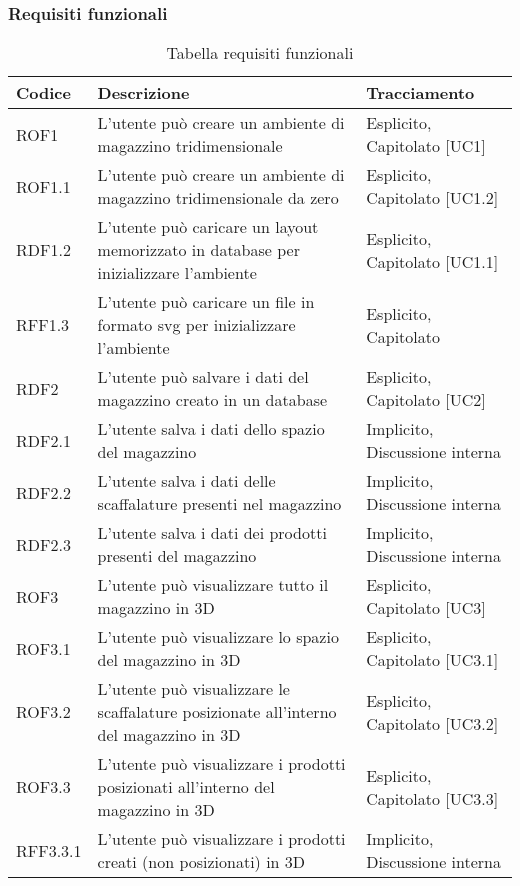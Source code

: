 \subsubsection{Requisiti funzionali}\label{subsec:requisiti_funzionali}
\renewcommand{\arraystretch}{2.5}
\begin{xltabular}{\textwidth}{ p{0.1\textwidth} | X | p{0.3\textwidth} }
    \textbf{\color{white} Codice} & \textbf{\color{white} Descrizione} & \textbf{\color{white} Tracciamento} \\ 
    \endhead

    \caption{Tabella requisiti funzionali} 
    \endlastfoot

    ROF1 & L'utente può creare un ambiente di magazzino tridimensionale & Esplicito, Capitolato [UC1]\\
    ROF1.1 & L'utente può creare un ambiente di magazzino tridimensionale da zero & Esplicito, Capitolato [UC1.2]\\
    RDF1.2 & L'utente può caricare un layout memorizzato in database per inizializzare l'ambiente & Esplicito, Capitolato [UC1.1]\\
    RFF1.3 & L'utente può caricare un file in formato svg per inizializzare l'ambiente & Esplicito, Capitolato \\
    RDF2 & L'utente può salvare i dati del magazzino creato in un database & Esplicito, Capitolato [UC2]\\  
    RDF2.1 & L'utente salva i dati dello spazio del magazzino & Implicito, Discussione interna \\  
    RDF2.2 & L'utente salva i dati delle scaffalature presenti nel magazzino & Implicito, Discussione interna \\  
    RDF2.3 & L'utente salva i dati dei prodotti presenti del magazzino & Implicito, Discussione interna \\    
    ROF3 & L'utente può visualizzare tutto il magazzino in 3D & Esplicito, Capitolato [UC3]\\
    ROF3.1 & L'utente può visualizzare lo spazio del magazzino in 3D & Esplicito, Capitolato [UC3.1]\\
    ROF3.2 & L'utente può visualizzare le scaffalature posizionate all'interno del magazzino in 3D & Esplicito, Capitolato [UC3.2]\\
    ROF3.3 & L'utente può visualizzare i prodotti posizionati all'interno del magazzino in 3D & Esplicito, Capitolato [UC3.3]\\
    RFF3.3.1 & L'utente può visualizzare i prodotti creati (non posizionati) in 3D & Implicito, Discussione interna \\      

\end{xltabular}
